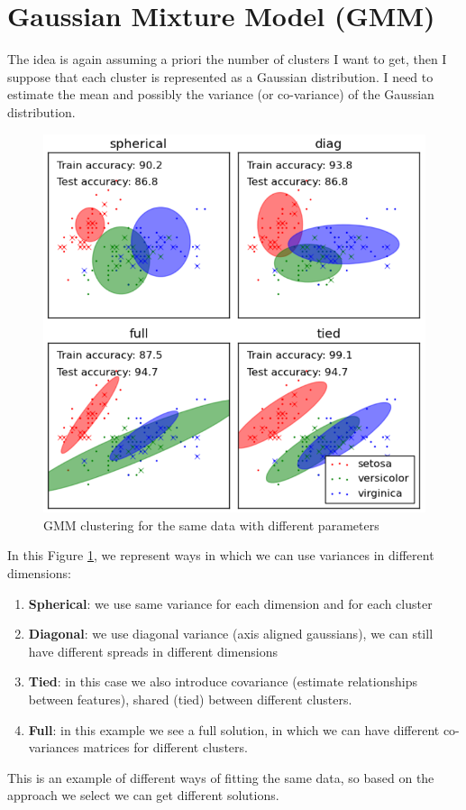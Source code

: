 \section{Gaussian Mixture Model (GMM)}
The idea is again assuming a priori the number of clusters I want to get, then I
suppose that each cluster is represented as a Gaussian distribution. I need to
estimate the mean and possibly the variance (or co-variance) of the Gaussian
distribution.

\begin{figure}[H]
	\centering
	\includegraphics[scale=0.5]{
		images/18_UnsupervisedLearning_gaussianMixtureModel.png
	}
	\caption{GMM clustering for the same data with different parameters}
	\label{fig:GMM}
\end{figure}

In this Figure \ref{fig:GMM}, we represent ways in which we can use variances in
different dimensions:
\begin{enumerate}
	\item \textbf{Spherical}: we use same variance for each dimension and for each
		cluster

	\item \textbf{Diagonal}: we use diagonal variance (axis aligned gaussians), we
		can still have different spreads in different dimensions

	\item \textbf{Tied}: in this case we also introduce covariance (estimate
		relationships between features), shared (tied) between different clusters.

	\item \textbf{Full}: in this example we see a full solution, in which we can
		have different co-variances matrices for different clusters.
\end{enumerate}
This is an example of different ways of fitting the same data, so based on the
approach we select we can get different solutions.\\

